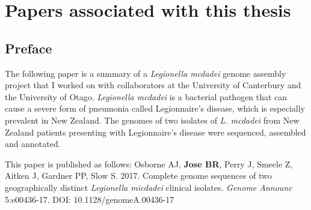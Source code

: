\appendix
%
%
\linespread{1}
\chapter{Papers associated with this thesis}
\section{Preface}
The following paper is a summary of a \textit{Legionella mcdadei} genome assembly project that I worked on with collaborators at the University of Canterbury and the University of Otago. \textit{ Legionella mcdadei} is a bacterial pathogen that can cause a severe form of pneumonia called Legionnaire's disease, which is especially prevalent in New Zealand. The genomes of two isolates of \textit{L. mcdadei} from New Zealand patients presenting with Legionnaire's disease were sequenced, assembled and annotated.

This paper is published as follows:
Osborne AJ, \textbf{Jose BR}, Perry J, Smeele Z, Aitken J, Gardner PP, Slow S. 2017. Complete genome sequences of two geographically distinct \textit{Legionella micdadei} clinical isolates. \textit{Genome Announc} 5:e00436-17. DOI: 10.1128/genomeA.00436-17

